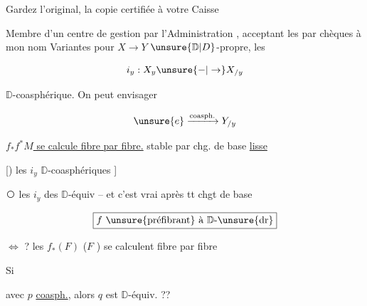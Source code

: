 Gardez l'original,  la copie certifiée à votre Caisse

Membre d'un centre de gestion  par l'Administration , acceptant les  par chèques  à mon nom
Variantes pour $X\to Y$ $\unsure{\mathbb D|D}$-propre,  les

\[i_y:X_y\unsure{\mathord{-}|\to}X_{/y}\]

$\mathbb D$-coasphérique. On peut envisager


\[\unsure{e}\xrightarrow{\text{coasph.}}Y_{/y}\]


\uline{$f_*f^*M$  se calcule fibre par fibre.} stable par chg. de base \uline{lisse}

[) les $i_y$ $\mathbb D$-coasphériques ]

\textcircled{\scriptsize{}} les $i_y$ des $\mathbb D$-équiv --  et c'est vrai après tt chgt de base


\[\boxed{\text{$f$ \unsure{préfibrant} à $\mathbb D$-\unsure{dr}}}\]

$\Longleftrightarrow$ ? les $f_*(F)$ ($F$ ) se calculent fibre par fibre

Si


avec $p$ \uline{coasph.}, alors $q$ est $\mathbb D$-équiv. ??

